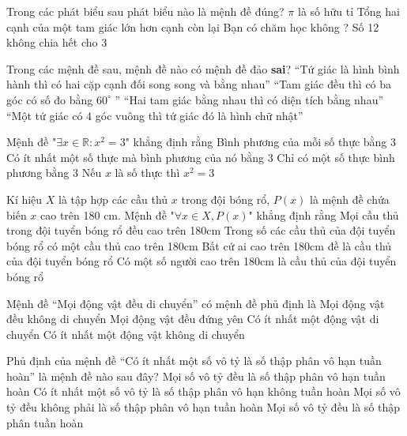 \begin{ex}
	Trong các phát biểu sau phát biểu nào là mệnh đề đúng?
	\choice
	{$\pi $ là số hữu tỉ}
	{\True Tổng hai cạnh của một tam giác lớn hơn cạnh còn lại}
	{Bạn có chăm học không ?}
	{Số 12 không chia hết cho 3}
	\loigiai{
	}
\end{ex}

\begin{ex}
	Trong các mệnh đề sau, mệnh đề nào có mệnh đề đảo \textbf{sai}?
	\choice
	{“Tứ giác là hình bình hành thì có hai cặp cạnh đối song song và bằng nhau”}
	{“Tam giác đều thì có ba góc có số đo bằng $60^{\circ}$ ”}
	{\True “Hai tam giác bằng nhau thì có diện tích bằng nhau”}
	{“Một tứ giác có $4$ góc vuông thì tứ giác đó là hình chữ nhật”}
	\loigiai{
	}
\end{ex}

\begin{ex}
	Mệnh đề "$\exists x\in \mathbb{R}:\text{}{x^2}=3$" khẳng định rằng
	\choice
	{Bình phương của mỗi số thực bằng 3}
	{\True Có ít nhất một số thực mà bình phương của nó bằng 3}
	{Chỉ có một số thực bình phương bằng 3}
	{Nếu $x$ là số thực thì $x^2=3$}
	\loigiai{
	}
\end{ex}

\begin{ex}
	Kí hiệu $X$ là tập hợp các cầu thủ $x$ trong đội bóng rổ, $P\left(x\right)$ là mệnh đề chứa biến  $x$ cao trên 180 cm. Mệnh đề "$\forall x\in X,\text{}P(x)$" khẳng định rằng 
	\choice
	{\True Mọi cầu thủ trong đội tuyển bóng rổ đều cao trên 180cm}
	{Trong số các cầu thủ của đội tuyển bóng rổ có một cầu thủ cao trên 180cm}
	{Bất cứ ai cao trên 180cm đề là cầu thủ của đội tuyển bóng rổ}
	{Có một số người cao trên 180cm là cầu thủ của đội tuyển bóng rổ}
	\loigiai{
	}
\end{ex}

\begin{ex}
	Mệnh đề “Mọi động vật đều di chuyển” có mệnh đề phủ định là
	\choice
	{Mọi động vật đều không di chuyển}
	{Mọi động vật đều đứng yên}
	{Có ít nhất một động vật di chuyển}
	{\True Có ít nhất một động vật không di chuyển}
	\loigiai{
	}
\end{ex}

\begin{ex}
	Phủ định của mệnh đề “Có ít nhất một số vô tỷ là số thập phân vô hạn tuần hoàn” là mệnh đề nào sau đây?
	\choice
	{Mọi số vô tỷ đều là số thập phân vô hạn tuần hoàn}
	{Có ít nhất một số vô tỷ là số thập phân vô hạn không tuần hoàn}
	{\True Mọi số vô tỷ đều không phải là số thập phân vô hạn tuần hoàn}
	{Mọi số vô tỷ đều là số thập phân tuần hoàn}
	\loigiai{
	}
\end{ex}

